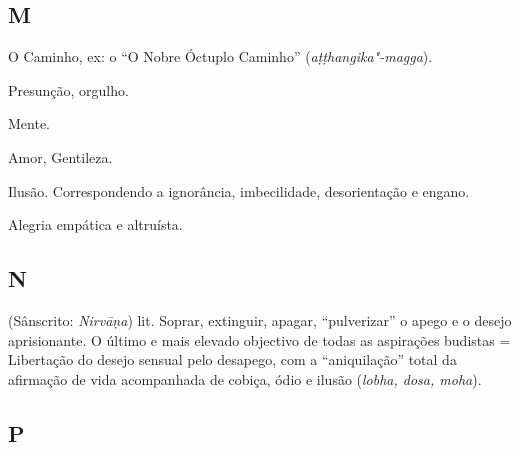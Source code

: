 \subsection{M}

\begin{glossarydescription}

\item[Magga] O Caminho, ex: o “O Nobre Óctuplo Caminho”
(\emph{aṭṭhangika"-magga}).

\item[Māna] Presunção, orgulho.

\item[Mano] Mente.

\item[Mettā] Amor, Gentileza.

\item[Moha] Ilusão. Correspondendo a ignorância, imbecilidade, desorientação e
engano.

\item[Muditā] Alegria empática e altruísta.

\end{glossarydescription}

\subsection{N}

\begin{glossarydescription}

\item[Nibbāna] (Sânscrito: \emph{Nirvāṇa}) lit. Soprar, extinguir, apagar,
“pulverizar” o apego e o desejo aprisionante. O último e mais elevado
objectivo de todas as aspirações budistas = Libertação do desejo sensual pelo
desapego, com a “aniquilação” total da afirmação de vida acompanhada
de cobiça, ódio e ilusão (\emph{lobha, dosa, moha}).

\end{glossarydescription}

\subsection{P}

